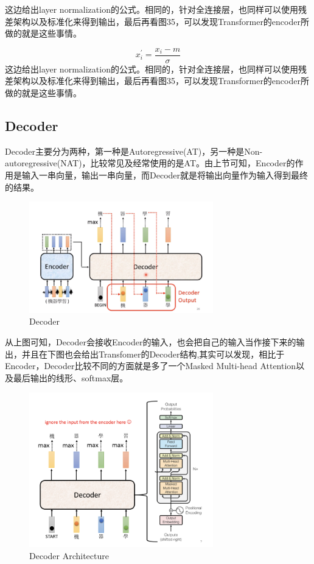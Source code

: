 \documentclass{article}
\begin{document}
\indent 这边给出layer normalization的公式。相同的，针对全连接层，也同样可以使用残差架构以及标准化来得到输出，最后再看图35，可以发现Transformer的encoder所做的就是这些事情。 \par
\begin{equation}
    x^{\prime}_{i} = \frac{x_{i}-m}{\sigma}
\end{equation}
\indent 这边给出layer normalization的公式。相同的，针对全连接层，也同样可以使用残差架构以及标准化来得到输出，最后再看图35，可以发现Transformer的encoder所做的就是这些事情。 \par

\subsection{Decoder}
\indent Decoder主要分为两种，第一种是Autoregressive(AT)，另一种是Non-autoregressive(NAT)，比较常见及经常使用的是AT。由上节可知，Encoder的作用是输入一串向量，输出一串向量，而Decoder就是将输出向量作为输入得到最终的结果。\par
\begin{figure}[H]
    \centering
    \includegraphics[width=8cm]{picture/DecoderOutput.png}
    \caption{Decoder }
    \label{fig:galxy}
\end{figure}
\indent 从上图可知，Decoder会接收Encoder的输入，也会把自己的输入当作接下来的输出，并且在下图也会给出Transfomer的Decoder结构,其实可以发现，相比于Encoder，Decoder比较不同的方面就是多了一个Masked Multi-head Attention以及最后输出的线形、softmax层。
\begin{figure}[H]
    \centering
    \includegraphics[width=8cm]{picture/DecoderArchitecture.png}
    \caption{Decoder Architecture}
    \label{fig:galxy}
\end{figure}
\end{document}
